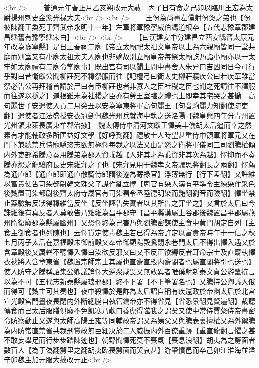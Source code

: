 <br />
　　普通元年春正月乙亥朔改元大赦　丙子日有食之己卯以臨川王宏為太尉揚州刺史金紫光禄大夫<br />
<br />
　　王份為尚書左僕射份奐之弟也【份彼陳翻王奐死于齊武帝永明十一年】左軍將軍豫寧威伯馮道根卒【五代志豫章郡建昌縣舊有豫寧縣宋白】<br />
<br />
　　【曰漢建安中分建昌立西安縣晉太康元年改為豫寧縣】是日上春祠二廟【帝立太廟祀太祖文皇帝以上為六親廟皆同一堂共庭而别室又有小廟太祖太夫人廟也非嫡故别立廟皇帝每祭太廟訖乃詣小廟亦以一太牢如太廟禮有二廟令掌廟事】既出宫有司以聞上問中書舍人朱异曰吉凶同日今可行乎對曰昔衛獻公聞柳莊死不釋祭服而往【記檀弓曰衛太史柳莊寢疾公曰若疾革雖當祭必告公再拜稽首請於尸曰有臣柳莊也者非寡人之臣社稷之臣也聞之死請往不釋服而往遂以襚之】道根雖未為社稷之臣亦有勞王室臨之禮也上即幸其宅哭之甚慟　高句麗世子安遣使入貢二月癸丑以安為寧東將軍高句麗王【句音駒麗力知翻使疏吏翻】遣使者江法盛授安衣冠劍佩魏光州兵就海中執之送洛陽【魏皇興四年分青州置光州領東萊長廣東牟郡治掖】　魏太傅侍中清河文獻王懌美丰儀胡太后逼而幸之然素有才能輔政多所匡益好文學【好呼到翻】禮敬士人時望甚重侍中領軍將軍元乂在門下兼總禁兵恃寵驕恣志欲無極懌每裁之以法乂由是怨之衛將軍儀同三司劉騰權傾内外吏部希騰意奏用騰弟為郡人資乖越【人非其才為乖資非其次為越】懌抑而不奏騰亦怨之龍驤府長史宋維弁之子也【宋弁見用于魏孝文帝驤思將翻長之兩翻】懌薦為通直郎【通直郎即通直散騎侍郎隋後遂為寄禄官】浮薄無行【行下孟翻】乂許維以富貴使告司染都尉韓文殊父子謀作亂立懌【周官有染人漢有平準令主練染作采色後魏置司染都尉後齊太府寺屬官有司染署令丞陸德明染而艷翻劉音而險翻】懌坐禁止案驗無反狀得釋維當反坐【反坐誣告失實者以其所告之罪坐之】乂言於太后曰今誅維後有真反者人莫敢告乃黜維為昌平郡守【昌平縣漢屬上谷郡後魏置昌平郡屬燕州隋復廢郡為縣屬幽州】乂恐懌終為己害乃與劉騰密謀使主食中黄門胡定自列【主食主御食者也列陳也】云懌貨定使毒魏主若已得為帝許定以富貴帝時年十一信之秋七月丙子太后在嘉福殿未御前殿乂奉帝御顯陽殿騰閉永巷門太后不得出懌入遇乂於含章殿後乂厲聲不聽懌入懌曰汝欲反邪乂曰乂不反正欲縛反者耳命宗士及直齋執懌衣袂將入含章東省【魏置宗師宗士其屬也直齋直殿内齋閤者也屬直閣將引也送也】使人防守之騰稱詔集公卿議論懌大逆衆咸畏乂無敢異者唯僕射新泰文貞公游肇抗言以為不可【五代志新泰縣屬琅邪郡】終不下署【不下筆署名也】乂騰持公卿議入俄而得可【魏主可其奏也】夜中殺懌於是詐為太后詔自稱有疾還政於帝幽太后於北宮宣光殿宫門晝夜長閉内外斷絶騰自執管鑰帝亦不得省見【省悉景翻見賢遍翻】裁聽傳食而已太后服膳俱廢不免飢寒乃歎曰養虎得噬我之謂矣又使中常侍賈粲侍帝書密令防察動止乂遂與太師高陽王雍等同輔政帝謂乂為姨父乂與騰表裏擅權乂為外禦騰為内防常直禁省共裁刑賞政無巨細决於二人威振内外百僚重跡【重直龍翻言懼之甚不敢妄舉足而行步步踏陳迹也】朝野聞懌死莫不喪氣【喪息浪翻】胡夷為之剺面者數百人【為于偽翻剺里之翻胡夷臨喪剺面而哭哀甚】游肇憤邑而卒己卯江淮海並溢　辛卯魏主加元服大赦改元正<br />
